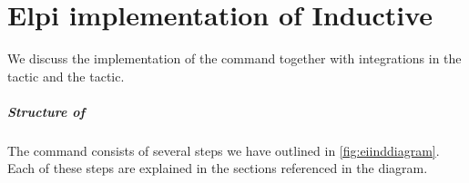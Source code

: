 \documentclass[thesis.tex]{subfiles}
\begin{document}
\VerbatimFootnotes

\chapter{Elpi implementation of Inductive}\label{ch:inductiveimpl}
We discuss the implementation of the  command together with integrations in the  tactic and the  tactic.

\paragraph{Structure of }
The  command consists of several steps we have outlined in \cref{fig:eiinddiagram}. Each of these steps are explained in the sections referenced in the diagram.
\end{document}
